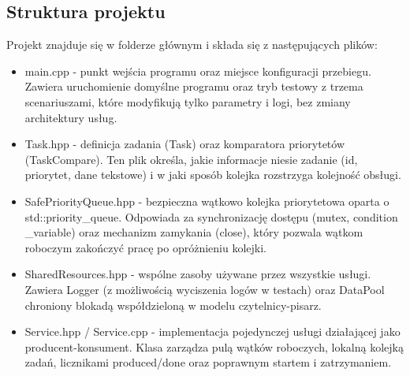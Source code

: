 \documentclass[a4paper,12pt]{article}
\begin{document}
        \subsection{Struktura projektu}
            \vspace{-0.2em}
            Projekt znajduje się w folderze głównym i składa się z następujących plików:
            \begin{itemize}
                \item main.cpp - punkt wejścia programu oraz miejsce konfiguracji przebiegu. Zawiera uruchomienie domyślne programu oraz tryb testowy z trzema scenariuszami, które modyfikują tylko parametry i logi, bez zmiany architektury usług.
                \item Task.hpp - definicja zadania (Task) oraz komparatora priorytetów (TaskCompare). Ten plik określa, jakie informacje niesie zadanie (id, priorytet, dane tekstowe) i w jaki sposób kolejka rozstrzyga kolejność obsługi.
                \item SafePriorityQueue.hpp - bezpieczna wątkowo kolejka priorytetowa oparta o std::priority\_queue. Odpowiada za synchronizację dostępu (mutex, condition\\\_variable) oraz mechanizm zamykania (close), który pozwala wątkom roboczym zakończyć pracę po opróżnieniu kolejki.
                \item SharedResources.hpp - wspólne zasoby używane przez wszystkie usługi. Zawiera Logger (z możliwością wyciszenia logów w testach) oraz DataPool chroniony blokadą współdzieloną w modelu czytelnicy-pisarz.
                \item Service.hpp / Service.cpp - implementacja pojedynczej usługi działającej jako producent-konsument. Klasa zarządza pulą wątków roboczych, lokalną kolejką zadań, licznikami produced/done oraz poprawnym startem i zatrzymaniem.
            \end{itemize}
        \newpage
        \vspace*{2em}
\end{document}

